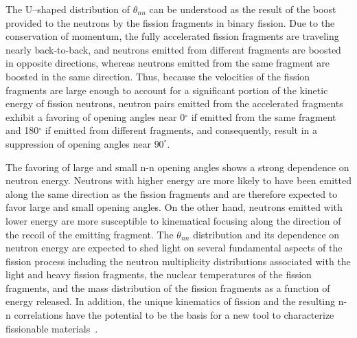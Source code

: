 The U--shaped distribution of $\theta_{nn}$ can be understood as the result of the boost provided to the neutrons by the fission fragments in binary fission.
Due to the conservation of momentum, the fully accelerated fission fragments are traveling nearly back-to-back, and neutrons emitted from different fragments are boosted in opposite directions, whereas neutrons emitted from the same fragment are boosted in the same direction.
Thus, because the velocities of the fission fragments are large enough to account for a significant portion of the kinetic energy of fission neutrons, neutron pairs emitted from the accelerated fragments exhibit a favoring of opening angles near 0$^{\circ}$ if emitted from the same fragment and 180$^{\circ}$ if emitted from different fragments, and consequently, result in a suppression of opening angles near $90^{\circ}$.

The favoring of large and small n-n opening angles shows a strong dependence on neutron energy.
Neutrons with higher energy are more likely to have been emitted along the same direction as the fission fragments and are therefore expected to favor large and small opening angles.
On the other hand, neutrons emitted with lower energy are more susceptible to kinematical focusing along the direction of the recoil of the emitting fragment.
The $\theta_{nn}$ distribution and its dependence on neutron energy are expected to shed light on several fundamental aspects of the fission process including the neutron multiplicity distributions associated with the light and heavy fission fragments, the nuclear temperatures of the fission fragments, and the mass distribution of the fission fragments as a function of energy released.
In addition, the unique kinematics of fission and the resulting n-n correlations have the potential to be the basis for a new tool to characterize fissionable materials~\cite{Talou2018}. %



